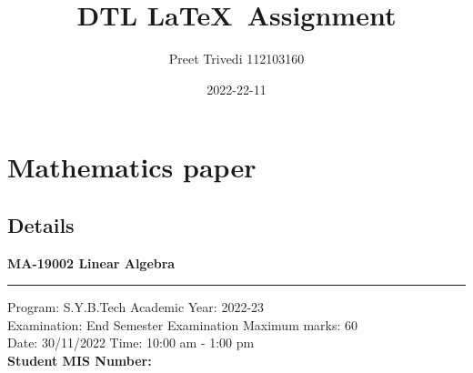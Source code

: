 \documentclass[12pt]{article}
\title{DTL \LaTeX\ Assignment}
\date{2022-22-11}
\author{Preet Trivedi 112103160}
\begin{document}
\maketitle
\newpage
\tableofcontents
\newpage
\section{Mathematics paper}
\subsection{Details}
\begin{center}
\large\textbf{MA-19002 Linear Algebra}
\end{center}
\hrule

\begin{flushright}
 Program: S.Y.B.Tech \hfill Academic Year: 2022-23 
\\Examination: End Semester Examination \hfill Maximum marks: 60
\\Date: 30/11/2022 \hfill Time: 10:00 am - 1:00 pm
\\\hfill \textbf{Student MIS Number:}\\ %
\end{flushright}
\begin{table}[h!]
\begin{flushright}
\begin{tabular}{|c|c|c|c|c|c|c|c|c|}
\hline
 & & & & & & & &  \\
\hline
\end{tabular}
\end{flushright}
\end{table}
\vspace{4cm}
\end{document}
